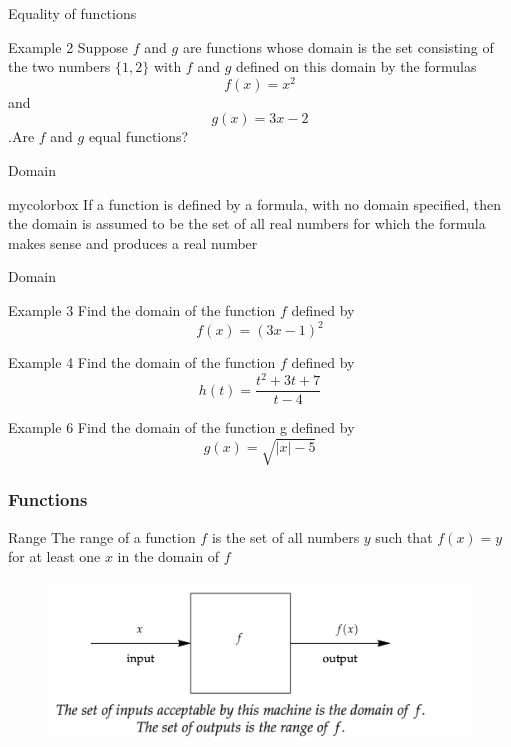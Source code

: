 \documentclass{beamer}
\begin{document}
\begin{frame}{Equality of functions}
  \begin{exampleblock}{Example 2}
    Suppose \(f\) and \(g\) are functions whose domain is the set consisting of the two numbers \(\{1, 2\}\) with \(f\) and \(g\) defined on this domain by the formulas
\[f (x) = x^2\] and \[g(x) = 3x-2\].Are \(f\) and \(g\) equal functions?
  \end{exampleblock}
\end{frame}

\begin{frame}{Domain}
  \begin{beamercolorbox}[wd=\textwidth,rounded=true,shadow=true]{mycolorbox}
    If a function is defined by a formula, with no domain specified, then the domain is assumed to be the set of all real numbers for which the formula makes sense and produces a real number
  \end{beamercolorbox}
\end{frame}

\begin{frame}{Domain}
  \begin{exampleblock}{Example 3}
    Find the domain of the function \(f\)  defined by \[f (x) = (3x-1)^2 \]
  \end{exampleblock}
  \begin{exampleblock}{Example 4}
    Find the domain of the function \(f\) defined by \[h (t) = \frac{t^2 + 3t + 7}{t-4} \]
  \end{exampleblock}
  \begin{exampleblock}{Example 6}
    Find the domain of the function g defined by \[g(x) = \sqrt{|x|-5}\]
  \end{exampleblock}
\end{frame}


\begin{frame}
  \frametitle{Functions}
  \begin{block}{Range}
    The range of a function \(f\) is the set of all numbers \(y\) such that \(f (x) = y\) for at least one \(x\) in the domain of \(f\)
  \end{block}
  \begin{figure}[h]    
    \centering
    \includegraphics[scale=0.5]{function-engine.png}
\end{figure}
\end{frame}
\end{document}
